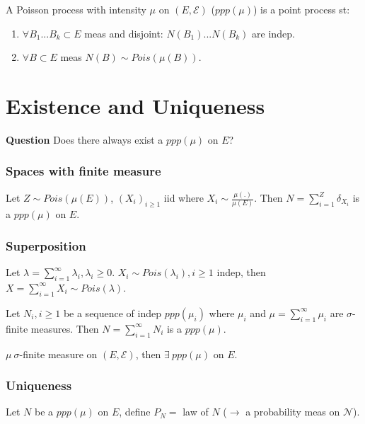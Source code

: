 \begin{defn}
	A Poisson process with intensity $\mu$ on $(E, \mathcal{E})$ ($ppp(\mu)$) is a point process st:
 \begin{enumerate}
	 \item $\forall B_1...B_k \subset E$ meas and disjoint: $N(B_1)...N(B_k)$ are indep.
	 \item $\forall B \subset E$ meas $N(B) \sim Pois(\mu(B))$.
\end{enumerate}
\end{defn}

\section{Existence and Uniqueness}
\textbf{Question} Does there always exist a $ppp(\mu)$ on $E$?
\subsubsection{Spaces with finite measure}
\begin{prop}[]
	Let $Z \sim Pois(\mu(E))$, $(X_i)_{i\geq 1}$ iid where $X_i \sim \frac{\mu(.)}{\mu(E)}$. Then $N= \sum_{i=1}^{Z} \delta_{X_i} $ is a $ppp(\mu)$ on $E$.
\end{prop}

\subsubsection{Superposition}
\begin{lemma}[]
	Let $\lambda = \sum_{i=1}^{\infty} \lambda_i, \lambda_i\geq 0$. $X_i \sim Pois(\lambda_i), i \geq 1$ indep, then $X = \sum_{i=1}^{\infty} X_i \sim Pois(\lambda)$.
\end{lemma}

\begin{theorem}[]
	Let $N_i, i\geq 1$ be a sequence of indep $ppp(\mu_i)$ where $\mu_i$ and $\mu = \sum_{i=1}^{\infty} \mu_i$ are $\sigma$-finite measures. Then $N= \sum_{i=1}^{\infty} N_i$ is a $ppp(\mu )$.
\end{theorem}

\begin{cor}[]
	$\mu \ \sigma$-finite measure on $(E, \mathcal{E})$, then $\exists\ ppp(\mu)$ on $E$.
\end{cor}

\subsubsection{Uniqueness}
Let $N$ be a $ppp(\mu )$ on $E$, define $P_N = $ law of $N$ ($\rightarrow$ a probability meas on $ \mathcal{N}$).

